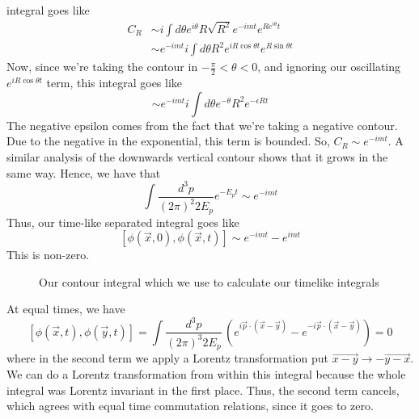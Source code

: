 integral goes like
\begin{align*}
C_R  & \sim i \int d \theta e^{ i \theta } R \sqrt{ R^ 2 } e^{  - i mt } e^{ R  e^{ i \theta } t } \\
& \sim  e^{  - i m t } i \int d \theta R^2 e ^{ i R \cos \theta t } e ^{ R \sin \theta t } 
\end{align*} Now, since we're taking the contour in 
$  -  \frac{\pi}{2 } <  \theta < 0$, and ignoring
our oscillating $ e ^{  i R \cos \theta t }$ term, 
this integral goes like 
\[
\sim e^{  - i m t } i  \int  d  \theta e^{ - \theta } R^2 e^{  - \epsilon R t }
\] The negative epsilon comes from the fact that 
we're taking a negative contour. Due to 
the negative in the exponential, this term is bounded. So, 
$ C_R \sim e^{  - i m t}$. A similar analysis of the 
downwards vertical contour shows that it grows in the same way. Hence, we have that 
\[
\int \frac{ d^ 3 p }{ ( 2 \pi )^2 2 E_{ p }} e^{  - E_{ p } t } \sim e^{ - i m t } 
\] Thus, our time-like separated integral goes like 
\[
[ \phi ( \vec{x}, 0), \phi ( \vec{x}, t ) ] \sim e^{  - i m t }  - e^{ i m t }
\] This is non-zero. 
\begin{figure}[h]
\centering 
{} 
\caption{Our contour integral which we use to calculate our timelike integrals}
\end{figure}

At equal times, we have 
\[
[ \phi ( \vec{x}, t ) , \phi ( \vec{y}, t ) ] = \int \frac{d^ 3 p }{ ( 2 \pi )^3 2E_p }\, ( e^{ i \vec{p} \cdot  ( \vec{x} - \vec{y}) }  - e^{  - i \vec{p} \cdot  ( \vec{x} - \vec{y}) } )  = 0  
\] where in the second term we apply a Lorentz transformation put $\vec{x - y } \to  - \vec{y - x}$. We can do a Lorentz transformation from within this integral because the whole 
integral was Lorentz invariant in the first place. 
Thus, the second term cancels, which agrees with equal time
commutation relations, since it goes to zero. 


